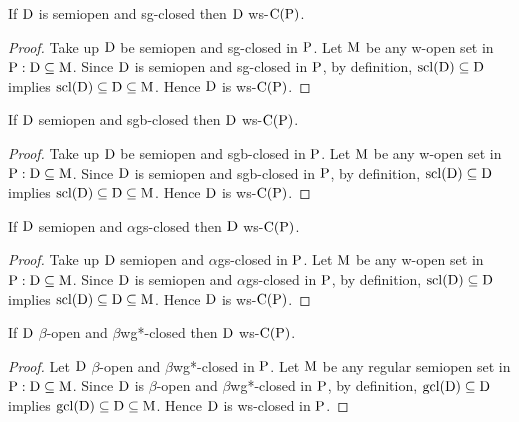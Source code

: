 \begin{thm}\label{2.2.39}
If $\mathrm{D}$ is semiopen and sg-closed then $\mathrm{D}$ ws-$\mathrm{C}(\mathrm{P})$.
\end{thm}

\begin{proof}
Take up $\mathrm{D}$ be semiopen and sg-closed in $\mathrm{P}$. Let $\mathrm{M}$ be any w-open set in $\mathrm{P} : \mathrm{D}\subseteq \mathrm{M}$. Since $\mathrm{D}$ is semiopen and sg-closed in $\mathrm{P}$, by definition, $\mathrm{scl}(\mathrm{D})\subseteq \mathrm{D}$ implies $\mathrm{scl}(\mathrm{D})\subseteq \mathrm{D}\subseteq \mathrm{M}$. Hence $\mathrm{D}$ is ws-$\mathrm{C}(\mathrm{P})$.
\end{proof}

\begin{thm}\label{thm2.2.40}
If $\mathrm{D}$ semiopen and sgb-closed then $\mathrm{D}$ ws-$\mathrm{C}(\mathrm{P})$.
\end{thm}

\begin{proof}
Take up $\mathrm{D}$ be semiopen and sgb-closed in $\mathrm{P}$. Let $\mathrm{M}$ be any w-open set in $\mathrm{P} : \mathrm{D}\subseteq \mathrm{M}$. Since $\mathrm{D}$ is semiopen and sgb-closed in $\mathrm{P}$, by definition, $\mathrm{scl}(\mathrm{D})\subseteq \mathrm{D}$ implies $\mathrm{scl}(\mathrm{D})\subseteq \mathrm{D}\subseteq \mathrm{M}$. Hence $\mathrm{D}$ is ws-$\mathrm{C}(\mathrm{P})$.
\end{proof}

\begin{thm}\label{thm2.2.41}
If $\mathrm{D}$ semiopen and $\alpha$gs-closed then $\mathrm{D}$ ws-$\mathrm{C}(\mathrm{P})$.
\end{thm}

\begin{proof}
Take up $\mathrm{D}$ semiopen and $\alpha$gs-closed in $\mathrm{P}$. Let $\mathrm{M}$ be any w-open set in $\mathrm{P} : \mathrm{D}\subseteq \mathrm{M}$. Since $\mathrm{D}$ is semiopen and $\alpha$gs-closed in $\mathrm{P}$, by definition, $\mathrm{scl}(\mathrm{D})\subseteq \mathrm{D}$ implies $\mathrm{scl}(\mathrm{D})\subseteq \mathrm{D}\subseteq \mathrm{M}$. Hence $\mathrm{D}$ is ws-$\mathrm{C}(\mathrm{P})$.
\end{proof}

\begin{thm}\label{thm2.2.42}
If $\mathrm{D}$ $\beta$-open and $\beta$wg*-closed then $\mathrm{D}$ ws-$\mathrm{C}(\mathrm{P})$.
\end{thm}

\begin{proof}
Let $\mathrm{D}$ $\beta$-open and $\beta$wg*-closed in $\mathrm{P}$. Let $\mathrm{M}$ be any regular semiopen set in $\mathrm{P} : \mathrm{D}\subseteq \mathrm{M}$. Since $\mathrm{D}$ is $\beta$-open and $\beta$wg*-closed in $\mathrm{P}$, by definition, $\mathrm{gcl}(\mathrm{D})\subseteq \mathrm{D}$ implies $\mathrm{gcl}(\mathrm{D})\subseteq \mathrm{D}\subseteq \mathrm{M}$. Hence $\mathrm{D}$ is ws-closed in $\mathrm{P}$.
\end{proof}

